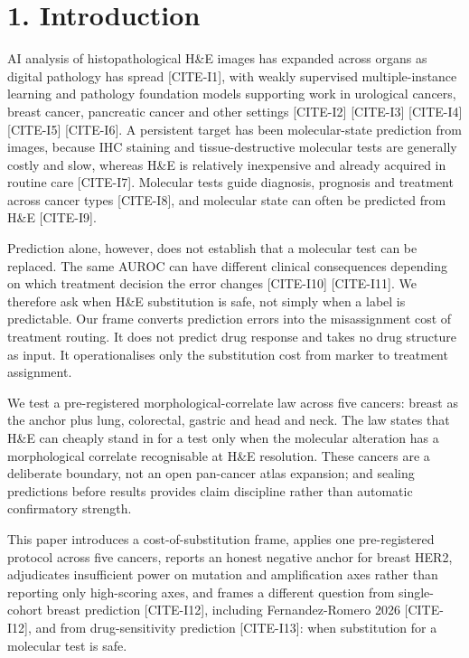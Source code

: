 \section*{1. Introduction}

AI analysis of histopathological H\&E images has expanded across organs as digital pathology has spread [CITE-I1], with weakly supervised multiple-instance learning and pathology foundation models supporting work in urological cancers, breast cancer, pancreatic cancer and other settings [CITE-I2] [CITE-I3] [CITE-I4] [CITE-I5] [CITE-I6]. A persistent target has been molecular-state prediction from images, because IHC staining and tissue-destructive molecular tests are generally costly and slow, whereas H\&E is relatively inexpensive and already acquired in routine care [CITE-I7]. Molecular tests guide diagnosis, prognosis and treatment across cancer types [CITE-I8], and molecular state can often be predicted from H\&E [CITE-I9].

Prediction alone, however, does not establish that a molecular test can be replaced. The same AUROC can have different clinical consequences depending on which treatment decision the error changes [CITE-I10] [CITE-I11]. We therefore ask when H\&E substitution is safe, not simply when a label is predictable. Our frame converts prediction errors into the misassignment cost of treatment routing. It does not predict drug response and takes no drug structure as input. It operationalises only the substitution cost from marker to treatment assignment.

We test a pre-registered morphological-correlate law across five cancers: breast as the anchor plus lung, colorectal, gastric and head and neck. The law states that H\&E can cheaply stand in for a test only when the molecular alteration has a morphological correlate recognisable at H\&E resolution. These cancers are a deliberate boundary, not an open pan-cancer atlas expansion; and sealing predictions before results provides claim discipline rather than automatic confirmatory strength.

This paper introduces a cost-of-substitution frame, applies one pre-registered protocol across five cancers, reports an honest negative anchor for breast HER2, adjudicates insufficient power on mutation and amplification axes rather than reporting only high-scoring axes, and frames a different question from single-cohort breast prediction [CITE-I12], including Fernandez-Romero 2026 [CITE-I12], and from drug-sensitivity prediction [CITE-I13]: when substitution for a molecular test is safe.

